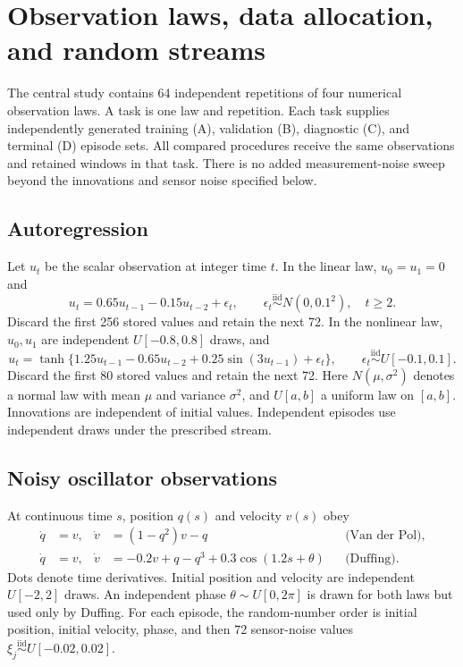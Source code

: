 \section{Observation laws, data allocation, and random streams}\label{sup:generators}
The central study contains 64 independent repetitions of four numerical observation laws. A task is one law and repetition. Each task supplies independently generated training (A), validation (B), diagnostic (C), and terminal (D) episode sets. All compared procedures receive the same observations and retained windows in that task. There is no added measurement-noise sweep beyond the innovations and sensor noise specified below.

\subsection{Autoregression}
Let $u_t$ be the scalar observation at integer time $t$. In the linear law, $u_0=u_1=0$ and
\[
 u_t=0.65u_{t-1}-0.15u_{t-2}+\epsilon_t,\qquad
 \epsilon_t\stackrel{\mathrm{iid}}\sim N(0,0.1^2),\quad t\geq2.
\]
Discard the first 256 stored values and retain the next 72. In the nonlinear law, $u_0,u_1$ are independent $U[-0.8,0.8]$ draws, and
\[
 u_t=\tanh\{1.25u_{t-1}-0.65u_{t-2}+0.25\sin(3u_{t-1})+\epsilon_t\},\qquad
 \epsilon_t\stackrel{\mathrm{iid}}\sim U[-0.1,0.1].
\]
Discard the first 80 stored values and retain the next 72. Here $N(\mu,\sigma^2)$ denotes a normal law with mean $\mu$ and variance $\sigma^2$, and $U[a,b]$ a uniform law on $[a,b]$. Innovations are independent of initial values. Independent episodes use independent draws under the prescribed stream.

\subsection{Noisy oscillator observations}
At continuous time $s$, position $q(s)$ and velocity $v(s)$ obey
\begin{align*}
\dot q&=v,&\dot v&=(1-q^2)v-q&&\text{(Van der Pol)},\\
\dot q&=v,&\dot v&=-0.2v+q-q^3+0.3\cos(1.2s+\theta)&&\text{(Duffing)}.
\end{align*}
Dots denote time derivatives. Initial position and velocity are independent $U[-2,2]$ draws. An independent phase $\theta\sim U[0,2\pi]$ is drawn for both laws but used only by Duffing. For each episode, the random-number order is initial position, initial velocity, phase, and then 72 sensor-noise values $\xi_j\stackrel{\mathrm{iid}}\sim U[-0.02,0.02]$.

